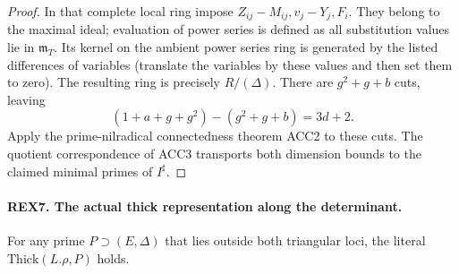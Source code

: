 \begin{proof}
In that complete local ring impose \(Z_{ij}-M_{ij},v_j-Y_j,F_i\).
They belong to the maximal ideal; evaluation of power series is
defined as all substitution values lie in \(\mathfrak m_T\).
Its kernel on the ambient power series ring is generated by the
listed differences of variables (translate the variables by these
values and then set them to zero). The resulting ring is precisely
\(R/(\Delta)\). There are \(g^2+g+b\) cuts, leaving
\[
 (1+a+g+g^2)-(g^2+g+b)=3d+2.
\]
Apply the prime-nilradical connectedness theorem ACC2 to these cuts.
The quotient correspondence of ACC3 transports both dimension
bounds to the claimed minimal primes of \(I^\sharp\).
\end{proof}

\paragraph{REX7. The actual thick representation along the determinant.}
\label{claim:REX7}
For any prime \(P\supset(E,\Delta)\) that lies outside both triangular
loci, the literal \(\mathrm{Thick}(L.\rho,P)\) holds.
